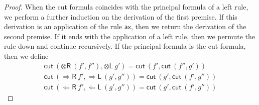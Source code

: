\documentclass[a4paper,UKenglish,cleveref,autoref,thm-restate, anonymous]{lipics-v2021}
\newcommand{\proofbox}[1]{\begin{array}{c} #1 \end{array}}
\newcommand{\ot}{\otimes}
\newcommand{\Larr}{\Leftarrow}
\newcommand{\Rarr}{\Rightarrow}
\newcommand{\mf}[1]{\mathsf{#1}}
\newcommand{\GG}{\Gamma}
\newcommand{\GD}{\Delta}
\newcommand{\GL}{\Lambda}
\newcommand{\vd}{\vdash}
\newcommand{\ax}{\mathsf{ax}}
\newcommand{\tl}{{\otimes}\mathsf{L}}
\newcommand{\tr}{{\otimes}\mathsf{R}}
\newcommand{\Ll}{{\Larr}\mathsf{L}}
\newcommand{\Lr}{{\Larr}\mathsf{R}}
\newcommand{\Rl}{{\Rarr}\mathsf{L}}
\newcommand{\Rr}{{\Rarr}\mathsf{R}}
\newcommand{\cut}{\mf{cut}}
\begin{document}
\begin{proof}
  When the cut formula coincides with the principal formula of a left rule, we perform a further induction on the derivation of the first premise.
  If this derivation is an application of the rule $\ax$, then we return the derivation of the second premise.
  If it ends with the application of a left rule, then we permute the rule down and continue recursively.
  If the principal formula is the cut formula, then we define
  \begin{equation}\label{eq:beta}
  \begin{array}{l}
    \cut\ (\tr \ (f', f'') , \tl \ g') = \cut \ (f' , \cut\ (f'', g')) \\
    \cut \ (\Rr \ f' , \Rl \ (g' , g'')) = \cut \ (g' , \cut \ (f' , g'')) \\
    \cut \ (\Lr \ f' , \Ll \ (g' , g'')) = \cut \ (g' , \cut \ (f' , g''))
  \end{array}
  \end{equation}
\end{proof}
\end{document}
